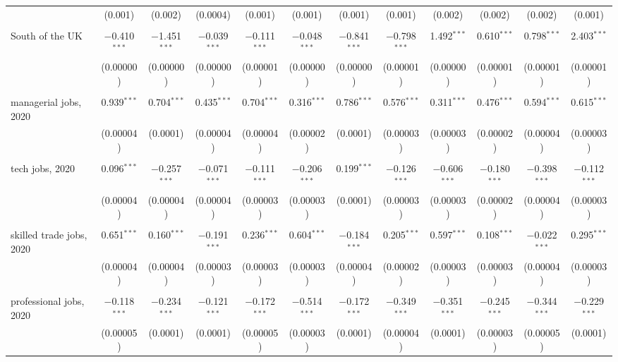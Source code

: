\documentclass[Royal,times,sageh]{sagej}
\begin{document}
\begin{table}
\begin{tabular}{@{\extracolsep{5pt}}lccccccccccc}
  & (0.001) & (0.002) & (0.0004) & (0.001) & (0.001) & (0.001) & (0.001) & (0.002) & (0.002) & (0.002) & (0.001) \\ 
  & & & & & & & & & & & \\ 
 South of the UK & $-$0.410$^{***}$ & $-$1.451$^{***}$ & $-$0.039$^{***}$ & $-$0.111$^{***}$ & $-$0.048$^{***}$ & $-$0.841$^{***}$ & $-$0.798$^{***}$ & 1.492$^{***}$ & 0.610$^{***}$ & 0.798$^{***}$ & 2.403$^{***}$ \\ 
  & (0.00000) & (0.00000) & (0.00000) & (0.00001) & (0.00000) & (0.00000) & (0.00001) & (0.00000) & (0.00001) & (0.00001) & (0.00001) \\ 
  & & & & & & & & & & & \\ 
 managerial jobs, 2020 & 0.939$^{***}$ & 0.704$^{***}$ & 0.435$^{***}$ & 0.704$^{***}$ & 0.316$^{***}$ & 0.786$^{***}$ & 0.576$^{***}$ & 0.311$^{***}$ & 0.476$^{***}$ & 0.594$^{***}$ & 0.615$^{***}$ \\ 
  & (0.00004) & (0.0001) & (0.00004) & (0.00004) & (0.00002) & (0.0001) & (0.00003) & (0.00003) & (0.00002) & (0.00004) & (0.00003) \\ 
  & & & & & & & & & & & \\ 
 tech jobs, 2020 & 0.096$^{***}$ & $-$0.257$^{***}$ & $-$0.071$^{***}$ & $-$0.111$^{***}$ & $-$0.206$^{***}$ & 0.199$^{***}$ & $-$0.126$^{***}$ & $-$0.606$^{***}$ & $-$0.180$^{***}$ & $-$0.398$^{***}$ & $-$0.112$^{***}$ \\ 
  & (0.00004) & (0.00004) & (0.00004) & (0.00003) & (0.00003) & (0.0001) & (0.00003) & (0.00003) & (0.00002) & (0.00004) & (0.00003) \\ 
  & & & & & & & & & & & \\ 
 skilled trade jobs, 2020 & 0.651$^{***}$ & 0.160$^{***}$ & $-$0.191$^{***}$ & 0.236$^{***}$ & 0.604$^{***}$ & $-$0.184$^{***}$ & 0.205$^{***}$ & 0.597$^{***}$ & 0.108$^{***}$ & $-$0.022$^{***}$ & 0.295$^{***}$ \\ 
  & (0.00004) & (0.00004) & (0.00003) & (0.00003) & (0.00003) & (0.00004) & (0.00002) & (0.00003) & (0.00003) & (0.00004) & (0.00003) \\ 
  & & & & & & & & & & & \\ 
 professional jobs, 2020 & $-$0.118$^{***}$ & $-$0.234$^{***}$ & $-$0.121$^{***}$ & $-$0.172$^{***}$ & $-$0.514$^{***}$ & $-$0.172$^{***}$ & $-$0.349$^{***}$ & $-$0.351$^{***}$ & $-$0.245$^{***}$ & $-$0.344$^{***}$ & $-$0.229$^{***}$ \\ 
  & (0.00005) & (0.0001) & (0.0001) & (0.00005) & (0.00003) & (0.0001) & (0.00004) & (0.0001) & (0.00003) & (0.00005) & (0.0001) \\ 

\end{tabular}
\end{table}
\end{document}
